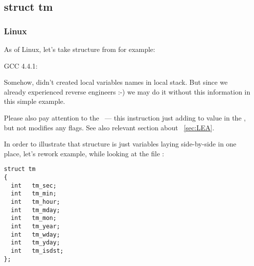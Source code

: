 \subsection{struct tm}

\subsubsection{Linux}

{As of Linux, let's take  structure from  for example:}



 GCC 4.4.1:

\IFRU{}{}

{Somehow, \IDA didn't created local variables names in local stack.
But since we already experienced reverse engineers :-) we may do it without this information in 
this simple example.}

{Please also pay attention to the  ~--- this instruction just adding  to value in the \EAX,
but not modifies any flags. See also relevant section about \LEA{}~\ref{sec:LEA}.}

{In order to illustrate that structure is just variables laying side-by-side in one place, let's rework
example, while looking at the file} :

\begin{lstlisting}[caption=time.h]
struct tm
{
  int	tm_sec;
  int	tm_min;
  int	tm_hour;
  int	tm_mday;
  int	tm_mon;
  int	tm_year;
  int	tm_wday;
  int	tm_yday;
  int	tm_isdst;
};
\end{lstlisting}



